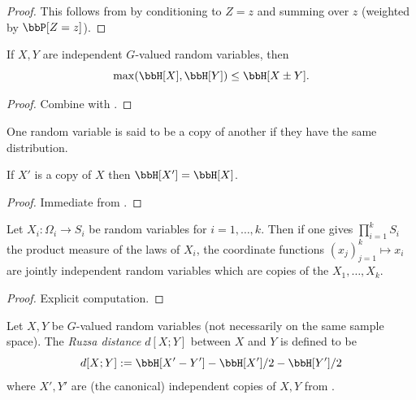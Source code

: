 \begin{proof}\leanok This follows from  by conditioning to $Z = z$ and summing over $z$ (weighted by $\bbP[Z=z]$).
\end{proof}

\begin{corollary}
  \label{sumset-lower}
  \leanok

  If $X,Y$ are independent $G$-valued random variables, then
  $$\max(\bbH[X], \bbH[Y]) \leq \bbH[X\pm Y]. $$
\end{corollary}
\begin{proof}
  \leanok

  Combine  with .
\end{proof}

One random variable is said to be a copy of another if they have the same distribution.

\begin{lemma}\label{copy-ent}
  \leanok
  If $X'$ is a copy of $X$ then $\bbH[X'] = \bbH[X]$.
\end{lemma}

\begin{proof}\leanok Immediate from .
\end{proof}

\begin{lemma}\label{independent-exist}
   \leanok
  Let $X_i : \Omega_i \to S_i$ be random variables for $i=1,\dots,k$.  Then if one gives $\prod_{i=1}^k S_i$ the product measure of the laws of $X_i$, the coordinate functions $(x_j)_{j=1}^k \mapsto x_i$ are jointly independent random variables which are copies of the $X_1,\dots,X_k$.
\end{lemma}

\begin{proof} \leanok
  Explicit computation.
\end{proof}

\begin{definition}\label{ruz-dist-def}
  \leanok
  Let $X,Y$ be $G$-valued random variables (not necessarily on the same sample space).  The \emph{Ruzsa distance} $d[X ;Y]$ between $X$ and $Y$ is defined to be
$$ d[X ;Y] := \bbH[X' - Y'] - \bbH[X']/2 - \bbH[Y']/2$$
where $X',Y'$ are (the canonical) independent copies of $X,Y$ from .
\end{definition}


